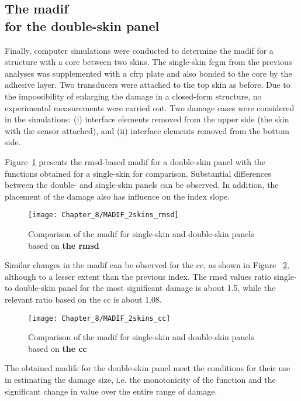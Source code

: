 \subsection{The \acl{madif}\\ for the double-skin panel}

Finally, computer simulations were conducted to determine the \ac{madif} for a structure with a core between two skins.
The single-skin \ac{fcgm} from the previous analyses was supplemented with a \ac{cfrp} plate and also bonded to the core by the adhesive layer.
Two transducers were attached to the top skin as before.
Due to the impossibility of enlarging the damage in a closed-form structure, no experimental measurements were carried out.
Two damage cases were considered in the simulations: (i) interface elements removed from the upper side (the skin with the sensor attached), and (ii) interface elements removed from the bottom side.

Figure~\ref{fig:madif_2skins_rmsd} presents the \ac{rmsd}-based \ac{madif} for a double-skin panel with the functions obtained for a single-skin for comparison.
Substantial differences between the double- and single-skin panels can be observed.
In addition, the placement of the damage also has influence on the index slope.
\begin{figure}[!htb]
	\begin{center}
		\texttt{[image: Chapter\_8/MADIF\_2skins\_rmsd]}
	\end{center}
	\caption{Comparison of the \acl{madif} for single-skin and double-skin panels based on \textbf{the \acf{rmsd}}}
	\label{fig:madif_2skins_rmsd}
\end{figure}
Similar changes in the \ac{madif} can be observed for the \ac{cc}, as shown in Figure ~\ref{fig:madif_2skins_cc}, although to a lesser extent than the previous index. 
The \ac{rmsd} values ratio single- to double-skin panel for the most significant damage is about 1.5, while the relevant ratio based on the \ac{cc} is about 1.08.
\begin{figure}[!htb]
	\begin{center}
		\texttt{[image: Chapter\_8/MADIF\_2skins\_cc]}
	\end{center}
	\caption{Comparison of the \acl{madif} for single-skin and double-skin panels based on \textbf{the \acf{cc}}}
	\label{fig:madif_2skins_cc}
\end{figure}
The obtained \acp{madif} for the double-skin panel meet the conditions for their use in estimating the damage size, i.e. the monotonicity of the function and the significant change in value over the entire range of damage.
\clearpage